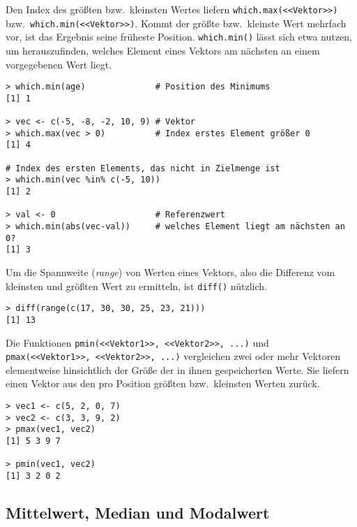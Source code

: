 Den Index des größten bzw.\ kleinsten Wertes liefern \lstinline!which.max(<<Vektor>>)! bzw.\ \lstinline!which.min(<<Vektor>>)!. Kommt der größte bzw.\ kleinste Wert mehrfach vor, ist das Ergebnis seine früheste Position. \lstinline!which.min()! lässt sich etwa nutzen, um herauszufinden, welches Element eines Vektors am nächsten an einem vorgegebenen Wert liegt.
\begin{lstlisting}
> which.min(age)              # Position des Minimums
[1] 1

> vec <- c(-5, -8, -2, 10, 9) # Vektor
> which.max(vec > 0)          # Index erstes Element größer 0
[1] 4

# Index des ersten Elements, das nicht in Zielmenge ist
> which.min(vec %in% c(-5, 10))
[1] 2

> val <- 0                    # Referenzwert
> which.min(abs(vec-val))     # welches Element liegt am nächsten an 0?
[1] 3
\end{lstlisting}

Um die Spannweite (\emph{range}) von Werten eines Vektors, also die Differenz vom kleinsten und größten Wert zu ermitteln, ist \lstinline!diff()! nützlich.
\begin{lstlisting}
> diff(range(c(17, 30, 30, 25, 23, 21)))
[1] 13
\end{lstlisting}

Die Funktionen \lstinline!pmin(<<Vektor1>>, <<Vektor2>>, ...)! und \lstinline!pmax(<<Vektor1>>, <<Vektor2>>, ...)! vergleichen zwei oder mehr Vektoren elementweise hinsichtlich der Größe der in ihnen gespeicherten Werte. Sie liefern einen Vektor aus den pro Position größten bzw.\ kleinsten Werten zurück.
\begin{lstlisting}
> vec1 <- c(5, 2, 0, 7)
> vec2 <- c(3, 3, 9, 2)
> pmax(vec1, vec2)
[1] 5 3 9 7

> pmin(vec1, vec2)
[1] 3 2 0 2
\end{lstlisting}

\subsection{Mittelwert, Median und Modalwert}
\label{sec:mean}

